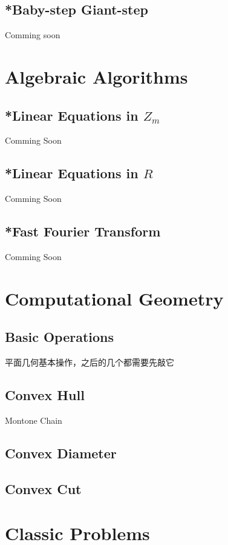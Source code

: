 \documentclass[a4paper,10pt]{report}
\begin{document}
	\section{*Baby-step Giant-step}
	Comming soon
	
\chapter{Algebraic Algorithms}

	\section{*Linear Equations in $Z_m$}
	Comming Soon
	
	\section{*Linear Equations in $R$}
	Comming Soon
	
	\section{*Fast Fourier Transform}
	Comming Soon

\chapter{Computational Geometry}
	
	\section{Basic Operations}
	平面几何基本操作，之后的几个都需要先敲它
	
	
	\section{Convex Hull}
	Montone Chain
	
	
	\section{Convex Diameter}
	
	
	\section{Convex Cut}
	

\chapter{Classic Problems}
\end{document}
